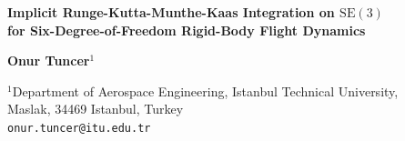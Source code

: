 \documentclass[a4paper,10pt]{article}
\theoremstyle{definition}
\begin{document}
\begin{center}
  {\Large\bfseries
    Implicit Runge-Kutta-Munthe-Kaas Integration on $\mathrm{SE}(3)$\\[4pt]
    for Six-Degree-of-Freedom Rigid-Body Flight Dynamics}

  \vspace{10pt}

  {\normalsize\bfseries Onur Tuncer$^{1}$}

  \vspace{4pt}

  {\small
    $^{1}$Department of Aerospace Engineering, Istanbul Technical University,\\
    Maslak, 34469 Istanbul, Turkey\\
    \texttt{onur.tuncer@itu.edu.tr}}

  \vspace{10pt}
\end{center}
\end{document}
